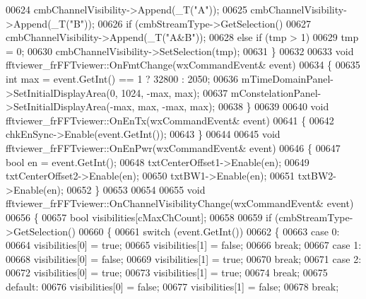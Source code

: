 \begin{DoxyCode}
{{{{{{{00624     cmbChannelVisibility->Append(_T(\textcolor{stringliteral}{"A"}));
00625     cmbChannelVisibility->Append(_T(\textcolor{stringliteral}{"B"}));
00626     \textcolor{keywordflow}{if} (cmbStreamType->GetSelection()%
00627         cmbChannelVisibility->Append(_T(\textcolor{stringliteral}{"A&B"}));
00628     \textcolor{keywordflow}{else} \textcolor{keywordflow}{if} (tmp > 1)
00629         tmp = 0;
00630     cmbChannelVisibility->SetSelection(tmp);
00631 \}
00632 
00633 \textcolor{keywordtype}{void} fftviewer_frFFTviewer::OnFmtChange(wxCommandEvent& event)
00634 \{
00635     \textcolor{keywordtype}{int} max = \textcolor{keyword}{event}.GetInt() == 1 ? 32800 : 2050;
00636     mTimeDomainPanel->SetInitialDisplayArea(0, 1024, -max, max);
00637     mConstelationPanel->SetInitialDisplayArea(-max, max, -max, max);
00638 \}
00639 
00640 \textcolor{keywordtype}{void} fftviewer_frFFTviewer::OnEnTx(wxCommandEvent& event)
00641 \{
00642     chkEnSync->Enable(event.GetInt());
00643 \}
00644 
00645 \textcolor{keywordtype}{void} fftviewer_frFFTviewer::OnEnPwr(wxCommandEvent& event)
00646 \{
00647     \textcolor{keywordtype}{bool} en = \textcolor{keyword}{event}.GetInt();
00648     txtCenterOffset1->Enable(en);
00649     txtCenterOffset2->Enable(en);
00650     txtBW1->Enable(en);
00651     txtBW2->Enable(en);
00652 \}
00653 
00654 
00655 \textcolor{keywordtype}{void} fftviewer_frFFTviewer::OnChannelVisibilityChange(wxCommandEvent& event)
00656 \{
00657     \textcolor{keywordtype}{bool} visibilities[cMaxChCount];
00658 
00659     \textcolor{keywordflow}{if} (cmbStreamType->GetSelection()%
00660     \{
00661         \textcolor{keywordflow}{switch} (event.GetInt())
00662         \{
00663         \textcolor{keywordflow}{case} 0:
00664             visibilities[0] = \textcolor{keyword}{true};
00665             visibilities[1] = \textcolor{keyword}{false};
00666             \textcolor{keywordflow}{break};
00667         \textcolor{keywordflow}{case} 1:
00668             visibilities[0] = \textcolor{keyword}{false};
00669             visibilities[1] = \textcolor{keyword}{true};
00670             \textcolor{keywordflow}{break};
00671         \textcolor{keywordflow}{case} 2:
00672             visibilities[0] = \textcolor{keyword}{true};
00673             visibilities[1] = \textcolor{keyword}{true};
00674             \textcolor{keywordflow}{break};
00675         \textcolor{keywordflow}{default}:
00676             visibilities[0] = \textcolor{keyword}{false};
00677             visibilities[1] = \textcolor{keyword}{false};
00678             \textcolor{keywordflow}{break};
}}}}}}}
\end{DoxyCode}
